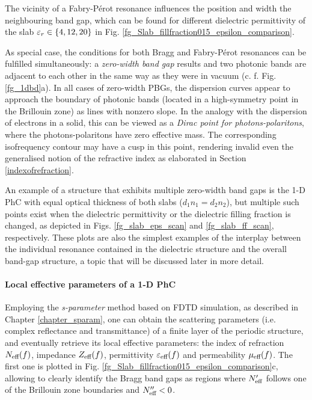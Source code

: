 The vicinity of a Fabry-Pérot resonance influences the position and width the neighbouring band gap, which can be found for different dielectric permittivity of the slab $\varepsilon_r\in\{4,12,20\}$ in Fig. \ref{fg_Slab_fillfraction015_epsilon_comparison}.

As special case, the conditions for both Bragg and Fabry-Pérot resonances can be fulfilled simultaneously: a \textit{zero-width band gap} results and two photonic bands are adjacent to each other in the same way as they were in vacuum (c. f. Fig. \ref{fg_1dbd}a). In all cases of zero-width PBGs, the dispersion curves appear to approach the boundary of photonic bands (located in a high-symmetry point in the Brillouin zone) as lines with nonzero slope. In the analogy with the dispersion of electrons in a solid, this can be viewed as a \textit{Dirac point for photons-polaritons}, where the photons-polaritons have zero effective mass. The corresponding isofrequency contour may have a cusp in this point, rendering invalid even the generalised notion of the refractive index as elaborated in Section \ref{indexofrefraction}.

An example of a structure that exhibits multiple zero-width band gaps is the 1-D PhC with equal optical thickness of both slabs ($d_1 n_1 = d_2 n_2$), but multiple such points exist when the dielectric permittivity or the dielectric filling fraction is changed, as depicted in Figs. \ref{fg_slab_eps_scan} and \ref{fg_slab_ff_scan}, respectively. These plots are also the simplest examples of the interplay between the individual resonance contained in the dielectric structure and the overall band-gap structure, a topic that will be discussed later in more detail.

\paragraph{Local effective parameters of a 1-D PhC}%
Employing the \textit{s-parameter} method based on FDTD simulation, as described in Chapter \ref{chapter_sparam}, one can obtain the scattering parameters (i.e. complex reflectance and transmittance) of a finite layer of the periodic structure, and eventually retrieve its local effective parameters: the index of refraction $N_{\text{eff} }(f)$, impedance $Z_{\text{eff} }(f)$, permittivity $\varepsilon_{\text{eff} }(f)$ and permeability $\mu_{\text{eff} }(f)$. The first one is plotted in Fig. \ref{fg_Slab_fillfraction015_epsilon_comparison}c, allowing to clearly identify the Bragg band gaps as regions where $N_{\text{eff} }'$ follows one of the Brillouin zone boundaries and $N_{\text{eff} }'' < 0$.

